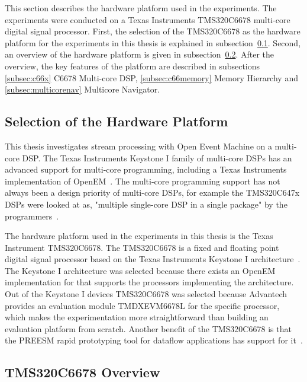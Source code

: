 This section describes the hardware platform used in the experiments. The experiments were conducted on a Texas Instruments TMS320C6678 multi-core digital signal processor. First, the selection of the TMS320C6678 as the hardware platform for the experiments in this thesis is explained in subsection~\ref{subsec:selection-of-platform}. Second, an overview of the hardware platform is given in subsection~\ref{subsec:hw-overview}. After the overview, the key features of the platform are described in subsections \ref{subsec:c66x} C6678 Multi-core DSP, \ref{subsec:c66memory} Memory Hierarchy and \ref{subsec:multicorenav} Multicore Navigator.

\subsection{Selection of the Hardware Platform}
\label{subsec:selection-of-platform}
This thesis investigates stream processing with Open Event Machine on a multi-core DSP. The Texas Instruments Keystone I family of multi-core DSPs has an advanced support for multi-core programming, including a Texas Instruments implementation of OpenEM~\cite{MCSDKbrochure}. The multi-core programming support has not always been a design priority of multi-core DSPs, for example the TMS320C647x DSPs were looked at as, "multiple single-core DSP in a single package" by the programmers~\cite{openemwhite}.

The hardware platform used in the experiments in this thesis is the Texas Instrument TMS320C6678. The TMS320C6678 is a fixed and floating point digital signal processor based on the Texas Instruments Keystone I architecture~\cite{tmsdatasheet}. The Keystone I architecture was selected because there exists an OpenEM implementation for that supports the processors implementing the architecture. Out of the Keystone I devices TMS320C6678 was selected because Advantech provides an evaluation module TMDXEVM6678L for the specific processor, which makes the experimentation more straightforward than building an evaluation platform from scratch. Another benefit of the TMS320C6678 is that the PREESM rapid prototyping tool for dataflow applications has support for it~\cite{pelcat2014prees}.

\subsection{TMS320C6678 Overview}
\label{subsec:hw-overview}

